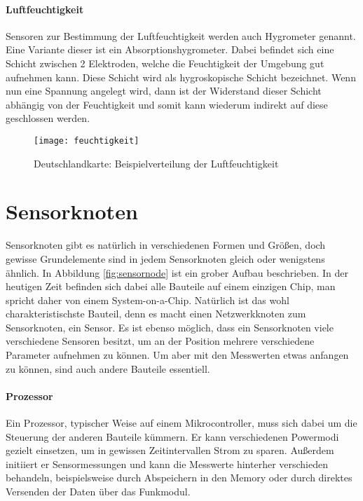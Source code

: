 \paragraph{Luftfeuchtigkeit}

Sensoren zur Bestimmung der Luftfeuchtigkeit werden auch Hygrometer genannt. Eine Variante dieser ist ein Absorptionshygrometer. Dabei befindet sich eine Schicht zwischen 2 Elektroden, welche die Feuchtigkeit der Umgebung gut aufnehmen kann. Diese Schicht wird als hygroskopische Schicht bezeichnet. Wenn nun eine Spannung angelegt wird, dann ist der Widerstand dieser Schicht abhängig von der Feuchtigkeit und somit kann wiederum indirekt auf diese geschlossen werden.

\begin{figure}[htbp]
\centering
\caption{Deutschlandkarte: Beispielverteilung der Luftfeuchtigkeit}
\label{fig:feuchtigkeit}
\texttt{[image: feuchtigkeit]}
\end{figure}

\section{Sensorknoten}

Sensorknoten gibt es natürlich in verschiedenen Formen und Größen, doch gewisse Grundelemente sind in jedem Sensorknoten gleich oder wenigstens ähnlich. In Abbildung \ref{fig:sensornode} ist ein grober Aufbau beschrieben. In der heutigen Zeit befinden sich dabei alle Bauteile auf einem einzigen Chip, man spricht daher von einem System-on-a-Chip.\newline
Natürlich ist das wohl charakteristischste Bauteil, denn es macht einen Netzwerkknoten zum Sensorknoten, ein Sensor. Es ist ebenso möglich, dass ein Sensorknoten viele verschiedene Sensoren besitzt, um an der Position mehrere verschiedene Parameter aufnehmen zu können.\newline
Um aber mit den Messwerten etwas anfangen zu können, sind auch andere Bauteile essentiell. 

\paragraph{Prozessor} Ein Prozessor, typischer Weise auf einem Mikrocontroller, muss sich dabei um die Steuerung der anderen Bauteile kümmern. Er kann verschiedenen Powermodi gezielt einsetzen, um in gewissen Zeitintervallen Strom zu sparen. Außerdem initiiert er Sensormessungen und kann die Messwerte hinterher verschieden behandeln, beispielsweise durch Abspeichern in den Memory oder durch direktes Versenden der Daten über das Funkmodul.
